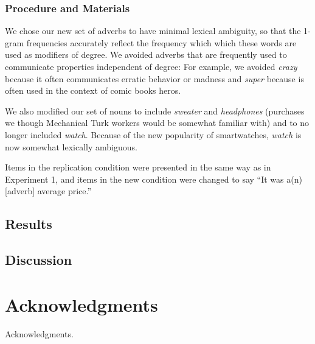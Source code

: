 \documentclass[10pt,letterpaper]{article}
\begin{document}
    \subsubsection{Procedure and Materials}
    
     We chose our new set of adverbs to have minimal lexical ambiguity, so that the 1-gram frequencies accurately reflect the frequency which which these words are used as modifiers of degree. We avoided adverbs that are frequently used to communicate properties independent of degree: For example, we avoided \emph{crazy} because it often communicates erratic behavior or madness and \emph{super} because is often used in the context of comic books heros.
     
     We also modified our set of nouns to include \emph{sweater} and \emph{headphones} (purchases we though Mechanical Turk workers would be somewhat familiar with) and to no longer included \emph{watch}. Because of the new popularity of smartwatches, \emph{watch} is now somewhat lexically ambiguous.
     
     Items in the replication condition were presented in the same way as in Experiment 1, and items in the new condition were changed to say ``It was a(n) [adverb] average price.''
     
  \subsection{Results}
  \subsection{Discussion}

\section{Acknowledgments}

Acknowledgments.

\nocite{label}




\setlength{\bibleftmargin}{.125in}
\setlength{\bibindent}{-\bibleftmargin}


\end{document}
